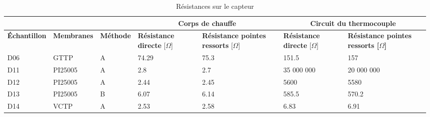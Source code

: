 \begin{table}[H]
    \begin{center}
        \begin{tabular}{|p{2cm}|p{2cm}|p{1.7cm}|p{2.1cm}|p{2.1cm}|p{2.1cm}|p{2.1cm}|}
            \hline
                                 &                    &                  & \multicolumn{2}{|c|}{\textbf{Corps de chauffe}} & \multicolumn{2}{|c|}{\textbf{Circuit du thermocouple}}                                                                                            \\
            \hline
            \textbf{Échantillon} & \textbf{Membranes} & \textbf{Méthode} & \textbf{Résistance directe} [$\Omega$]          & \textbf{Résistance pointes ressorts} [$\Omega$]        & \textbf{Résistance directe} [$\Omega$] & \textbf{Résistance pointes ressorts [$\Omega$]} \\
            \hline
            D06                  & GTTP               & A                & 74.29                                           & 75.3                                                   & 151.5                                  & 157                                             \\
            \hline
            D11                  & PI25005            & A                & 2.8                                             & 2.7                                                    & 35 000 000                             & 20 000 000                                      \\
            \hline
            D12                  & PI25005            & A                & 2.44                                            & 2.45                                                   & 5600                                   & 5580                                            \\
            \hline
            D13                  & PI25005            & B                & 6.07                                            & 6.14                                                   & 585.5                                  & 570.2                                           \\
            \hline
            D14                  & VCTP               & A                & 2.53                                            & 2.58                                                   & 6.83                                   & 6.91                                            \\
            \hline
        \end{tabular}
        \caption{Résistances sur le capteur}
        \label{tab:resistancePointeRessort}
    \end{center}
\end{table}

